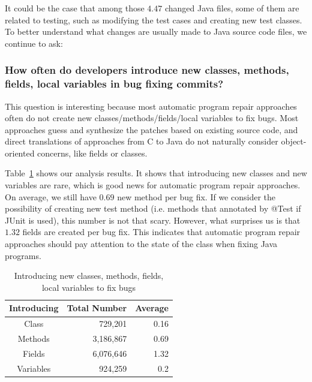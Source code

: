 \documentclass{sig-alternate-05-2015}
\newcommand{\todo}[1]
  {{\scriptsize \textbf{\color{red} {#1}}}}
\begin{document}
It could be the case that among those $4.47$ changed Java files, some of them
are related to testing, such as modifying the test cases and creating new test
classes. To better understand what changes are usually made to Java source code
files, we continue to ask:

\subsubsection*{How often do developers introduce new classes, methods, fields,
	local variables in
bug fixing commits?} \vspace{-0.3em}

This question is interesting because most automatic program repair approaches
often do not create new classes/methods/fields/local variables to fix bugs.
Most approaches guess and synthesize the patches based on existing source code,
and direct translations of approaches from C to Java do not naturally consider
object-oriented concerns, like fields or classes. 

Table~\ref{tbl:new} shows our analysis results. It shows that introducing new
classes and new variables are rare, which is good news for automatic program
repair approaches. On average, we still have $0.69$ new method per bug fix. If
we consider the possibility of creating new test method (i.e.  methods that
annotated by @Test if JUnit is used), this number is not that scary. However,
what surprises us is that $1.32$ fields are created per bug fix.  This indicates
that automatic program repair approaches should pay attention to the state of
the class when fixing Java programs.

\begin{table}
\centering
  \begin{tabular}{| c | r | r |}
  \hline
  Introducing & Total Number & Average \\ \hline \hline
  Class & 729,201 & 0.16 \\ \hline
  Methods & 3,186,867 & 0.69 \\ \hline
  Fields & 6,076,646 & 1.32 \\ \hline
  Variables & 924,259 & 0.2 \\ \hline
  \end{tabular}
  \caption{Introducing new classes, methods, fields, local variables to fix bugs}
  \label{tbl:new}
\end{table}

\end{document}
